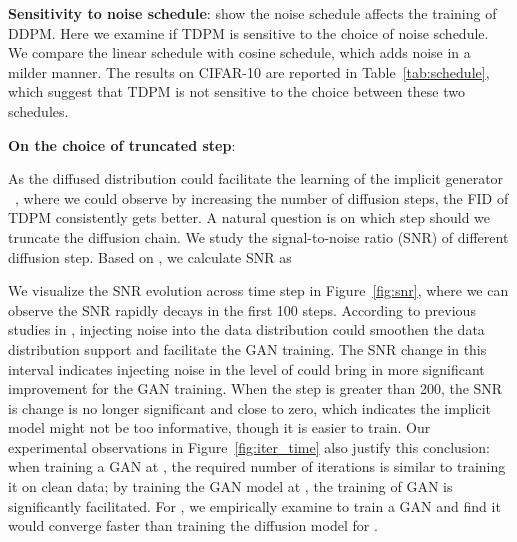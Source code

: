 \documentclass{article} \usepackage{iclr2023_conference,times}
\def\Figref#1{Figure~\ref{#1}}
\theoremstyle{plain}
\theoremstyle{definition}
\theoremstyle{remark}
\begin{document}
{\textbf{Sensitivity to noise schedule}:  \citet{nichol2021improved} show the noise schedule affects the training of DDPM. Here we examine if TDPM is sensitive to the choice of noise schedule. We compare the linear schedule with cosine schedule, which adds noise in a milder manner. The results on CIFAR-10 are reported in Table~\ref{tab:schedule}, which suggest that TDPM is not sensitive to the choice between these two schedules.

\begin{table}[ht]
\caption{\small Ablation study with different noise schedules on CIFAR-10. The number before and after ``/" denotes the FID using linear and cosine schedules, respectively.}
\label{tab:schedule}
\centering
\renewcommand{\arraystretch}{1.}
    \vspace{-3mm}
\end{table}


\textbf{On the choice of truncated step}: 
{
As the diffused distribution could facilitate the learning of the implicit generator ~\citep{arjovsky2017towards}, where we could observe by increasing the number of diffusion steps, the FID of TDPM consistently gets better. A natural question is on which step should we truncate the diffusion chain. We study the signal-to-noise ratio (SNR) of different diffusion step. Based on , we calculate SNR as

We visualize the SNR evolution across time step  in Figure~\ref{fig:snr}, where we can observe the SNR rapidly decays in the first 100 steps. According to previous studies in \citet{arjovsky2017towards}, injecting noise into the data distribution could smoothen the data distribution support and facilitate the GAN training. The SNR change in this interval indicates injecting noise in the level of  could bring in more significant improvement for the GAN training. When the step is greater than 200, the SNR is change is no longer significant and close to zero, which indicates the implicit model might not be too informative, though it is easier to train. Our experimental observations in \Figref{fig:iter_time}  also justify this conclusion: when training a GAN at , the required number of iterations is similar to training it on clean data; by training the GAN model at , the training of GAN is significantly facilitated. For , we empirically examine to train a GAN and find it would converge faster than training the diffusion model for . 
}


}
\end{document}
